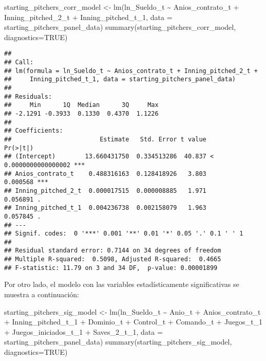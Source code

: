 \documentclass[
]{article}
\newenvironment{Shaded}{\begin{snugshade}}{\end{snugshade}}
\newcommand{\AttributeTok}[1]{\textcolor[rgb]{0.77,0.63,0.00}{#1}}
\newcommand{\ConstantTok}[1]{\textcolor[rgb]{0.00,0.00,0.00}{#1}}
\newcommand{\FunctionTok}[1]{\textcolor[rgb]{0.00,0.00,0.00}{#1}}
\newcommand{\NormalTok}[1]{#1}
\newcommand{\OtherTok}[1]{\textcolor[rgb]{0.56,0.35,0.01}{#1}}
\newcommand{\SpecialCharTok}[1]{\textcolor[rgb]{0.00,0.00,0.00}{#1}}
\begin{document}
\begin{Shaded}
\begin{Highlighting}[]
\NormalTok{starting\_pitchers\_corr\_model }\OtherTok{\textless{}{-}} \FunctionTok{lm}\NormalTok{(ln\_Sueldo\_t }\SpecialCharTok{\textasciitilde{}}\NormalTok{ Anios\_contrato\_t }\SpecialCharTok{+}\NormalTok{ Inning\_pitched\_2\_t }\SpecialCharTok{+}\NormalTok{ Inning\_pitched\_t\_1, }
                                                 \AttributeTok{data =}\NormalTok{ starting\_pitchers\_panel\_data)}
\FunctionTok{summary}\NormalTok{(starting\_pitchers\_corr\_model, }\AttributeTok{diagnostics=}\ConstantTok{TRUE}\NormalTok{)}
\end{Highlighting}
\end{Shaded}

\begin{verbatim}
## 
## Call:
## lm(formula = ln_Sueldo_t ~ Anios_contrato_t + Inning_pitched_2_t + 
##     Inning_pitched_t_1, data = starting_pitchers_panel_data)
## 
## Residuals:
##     Min      1Q  Median      3Q     Max 
## -2.1291 -0.3933  0.1330  0.4370  1.1226 
## 
## Coefficients:
##                        Estimate   Std. Error t value             Pr(>|t|)    
## (Intercept)        13.660431750  0.334513286  40.837 < 0.0000000000000002 ***
## Anios_contrato_t    0.488316163  0.128418926   3.803             0.000568 ***
## Inning_pitched_2_t  0.000017515  0.000008885   1.971             0.056891 .  
## Inning_pitched_t_1  0.004236738  0.002158079   1.963             0.057845 .  
## ---
## Signif. codes:  0 '***' 0.001 '**' 0.01 '*' 0.05 '.' 0.1 ' ' 1
## 
## Residual standard error: 0.7144 on 34 degrees of freedom
## Multiple R-squared:  0.5098, Adjusted R-squared:  0.4665 
## F-statistic: 11.79 on 3 and 34 DF,  p-value: 0.00001899
\end{verbatim}

Por otro lado, el modelo con las variables estadísticamente
significativas se muestra a continuación:

\begin{Shaded}
\begin{Highlighting}[]
\NormalTok{starting\_pitchers\_sig\_model }\OtherTok{\textless{}{-}} \FunctionTok{lm}\NormalTok{(ln\_Sueldo\_t }\SpecialCharTok{\textasciitilde{}}\NormalTok{ Anio\_t }\SpecialCharTok{+}\NormalTok{ Anios\_contrato\_t }\SpecialCharTok{+}\NormalTok{ Inning\_pitched\_t\_1 }\SpecialCharTok{+} 
\NormalTok{                                                Dominio\_t }\SpecialCharTok{+}\NormalTok{ Control\_t }\SpecialCharTok{+}\NormalTok{ Comando\_t }\SpecialCharTok{+}\NormalTok{ Juegos\_t\_1 }\SpecialCharTok{+} 
\NormalTok{                                                Juegos\_iniciados\_t\_1 }\SpecialCharTok{+}\NormalTok{ Saves\_2\_t\_1, }
                                                \AttributeTok{data =}\NormalTok{ starting\_pitchers\_panel\_data)}
\FunctionTok{summary}\NormalTok{(starting\_pitchers\_sig\_model, }\AttributeTok{diagnostics=}\ConstantTok{TRUE}\NormalTok{)}
\end{Highlighting}
\end{Shaded}
\end{document}
